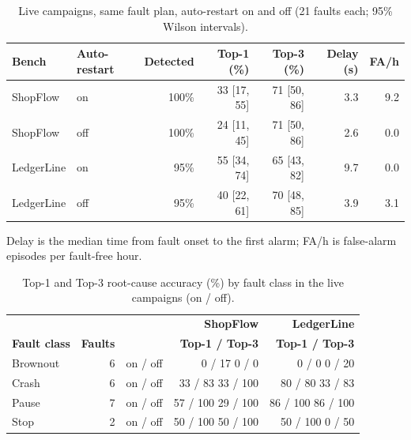 \begin{table}[!htbp]
\centering
\caption{Live campaigns, same fault plan, auto-restart on and off (21 faults each; 95\% Wilson intervals).}
\label{tab:livecampaign}
\small
\renewcommand{\arraystretch}{1.2}
\begin{tabular}{llrrrrr}
\toprule
\textbf{Bench} & \textbf{Auto-restart} & \textbf{Detected} & \textbf{Top-1 (\%)} & \textbf{Top-3 (\%)} & \textbf{Delay (s)} & \textbf{FA/h}\\
\midrule
ShopFlow & on  & 100\% & 33 [17, 55] & 71 [50, 86] & 3.3 & 9.2\\
ShopFlow & off & 100\% & 24 [11, 45] & 71 [50, 86] & 2.6 & 0.0\\
LedgerLine & on  & 95\% & 55 [34, 74] & 65 [43, 82] & 9.7 & 0.0\\
LedgerLine & off & 95\% & 40 [22, 61] & 70 [48, 85] & 3.9 & 3.1\\
\bottomrule
\end{tabular}

\smallskip
{\footnotesize Delay is the median time from fault onset to the first alarm; FA/h is false-alarm episodes per fault-free hour.}
\end{table}

\begin{table}[!htbp]
\centering
\caption{Top-1 and Top-3 root-cause accuracy (\%) by fault class in the live campaigns (on / off).}
\label{tab:liveclass}
\small
\renewcommand{\arraystretch}{1.15}
\begin{tabular}{lrrrr}
\toprule
 & & & \textbf{ShopFlow} & \textbf{LedgerLine}\\
\textbf{Fault class} & \textbf{Faults} & & \textbf{Top-1 / Top-3} & \textbf{Top-1 / Top-3}\\
\midrule
Brownout & 6 & on / off & 0 / 17 \hspace{4pt} 0 / 0 & 0 / 0 \hspace{4pt} 0 / 20\\
Crash & 6 & on / off & 33 / 83 \hspace{4pt} 33 / 100 & 80 / 80 \hspace{4pt} 33 / 83\\
Pause & 7 & on / off & 57 / 100 \hspace{4pt} 29 / 100 & 86 / 100 \hspace{4pt} 86 / 100\\
Stop & 2 & on / off & 50 / 100 \hspace{4pt} 50 / 100 & 50 / 100 \hspace{4pt} 0 / 50\\
\bottomrule
\end{tabular}
\end{table}

